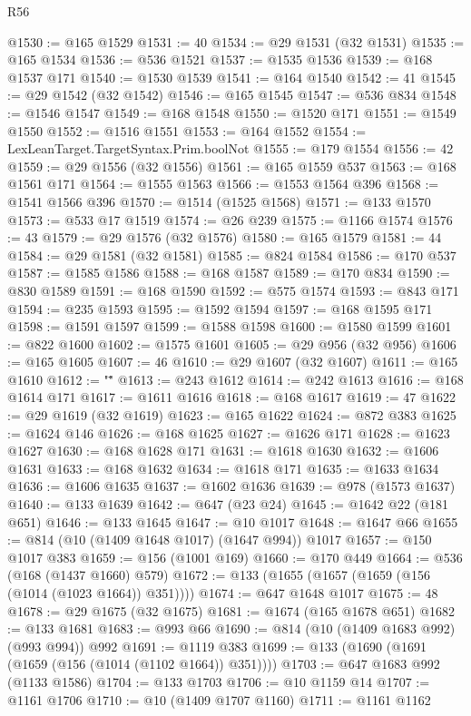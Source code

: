 \begin{lexlean}{R56}
\begin{coremodule}
@1530 := @165 @1529
@1531 := 40
@1534 := @29 @1531 (@32 @1531)
@1535 := @165 @1534
@1536 := @536 @1521
@1537 := @1535 @1536
@1539 := @168 @1537 @171
@1540 := @1530 @1539
@1541 := @164 @1540
@1542 := 41
@1545 := @29 @1542 (@32 @1542)
@1546 := @165 @1545
@1547 := @536 @834
@1548 := @1546 @1547
@1549 := @168 @1548
@1550 := @1520 @171
@1551 := @1549 @1550
@1552 := @1516 @1551
@1553 := @164 @1552
@1554 := LexLeanTarget.TargetSyntax.Prim.boolNot
@1555 := @179 @1554
@1556 := 42
@1559 := @29 @1556 (@32 @1556)
@1561 := @165 @1559 @537
@1563 := @168 @1561 @171
@1564 := @1555 @1563
@1566 := @1553 @1564 @396
@1568 := @1541 @1566 @396
@1570 := @1514 (@1525 @1568)
@1571 := @133 @1570
@1573 := @533 @17 @1519
@1574 := @26 @239
@1575 := @1166 @1574
@1576 := 43
@1579 := @29 @1576 (@32 @1576)
@1580 := @165 @1579
@1581 := 44
@1584 := @29 @1581 (@32 @1581)
@1585 := @824 @1584
@1586 := @170 @537
@1587 := @1585 @1586
@1588 := @168 @1587
@1589 := @170 @834
@1590 := @830 @1589
@1591 := @168 @1590
@1592 := @575 @1574
@1593 := @843 @171
@1594 := @235 @1593
@1595 := @1592 @1594
@1597 := @168 @1595 @171
@1598 := @1591 @1597
@1599 := @1588 @1598
@1600 := @1580 @1599
@1601 := @822 @1600
@1602 := @1575 @1601
@1605 := @29 @956 (@32 @956)
@1606 := @165 @1605
@1607 := 46
@1610 := @29 @1607 (@32 @1607)
@1611 := @165 @1610
@1612 := "\""
@1613 := @243 @1612
@1614 := @242 @1613
@1616 := @168 @1614 @171
@1617 := @1611 @1616
@1618 := @168 @1617
@1619 := 47
@1622 := @29 @1619 (@32 @1619)
@1623 := @165 @1622
@1624 := @872 @383
@1625 := @1624 @146
@1626 := @168 @1625
@1627 := @1626 @171
@1628 := @1623 @1627
@1630 := @168 @1628 @171
@1631 := @1618 @1630
@1632 := @1606 @1631
@1633 := @168 @1632
@1634 := @1618 @171
@1635 := @1633 @1634
@1636 := @1606 @1635
@1637 := @1602 @1636
@1639 := @978 (@1573 @1637)
@1640 := @133 @1639
@1642 := @647 (@23 @24)
@1645 := @1642 @22 (@181 @651)
@1646 := @133 @1645
@1647 := @10 @1017
@1648 := @1647 @66
@1655 := @814 (@10 (@1409 @1648 @1017) (@1647 @994)) @1017
@1657 := @150 @1017 @383
@1659 := @156 (@1001 @169)
@1660 := @170 @449
@1664 := @536 (@168 (@1437 @1660) @579)
@1672 := @133 (@1655 (@1657 (@1659 (@156 (@1014 (@1023 @1664)) @351))))
@1674 := @647 @1648 @1017
@1675 := 48
@1678 := @29 @1675 (@32 @1675)
@1681 := @1674 (@165 @1678 @651)
@1682 := @133 @1681
@1683 := @993 @66
@1690 := @814 (@10 (@1409 @1683 @992) (@993 @994)) @992
@1691 := @1119 @383
@1699 := @133 (@1690 (@1691 (@1659 (@156 (@1014 (@1102 @1664)) @351))))
@1703 := @647 @1683 @992 (@1133 @1586)
@1704 := @133 @1703
@1706 := @10 @1159 @14
@1707 := @1161 @1706
@1710 := @10 (@1409 @1707 @1160)
@1711 := @1161 @1162

\end{coremodule}
\end{lexlean}
